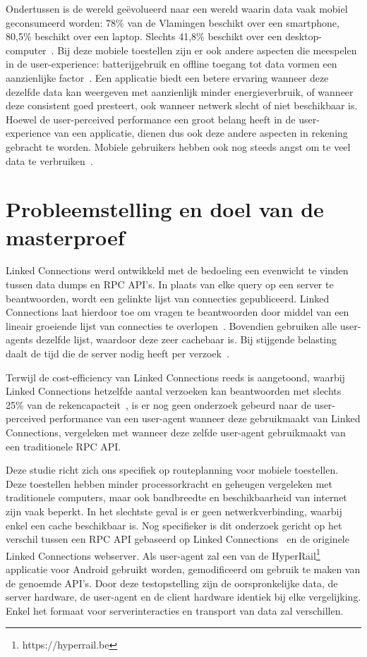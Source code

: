 Ondertussen is de wereld geëvolueerd naar een wereld waarin data vaak mobiel geconsumeerd worden: 78\% van de Vlamingen beschikt over een smartphone, 80,5\% beschikt over een laptop. Slechts 41,8\% beschikt over een desktop-computer~\citep{digimeter17}. Bij deze mobiele toestellen zijn er ook andere aspecten die meespelen in de user-experience: batterijgebruik en offline toegang tot data vormen een aanzienlijke factor~\citep{ickin12}. Een applicatie biedt een betere ervaring wanneer deze dezelfde data kan weergeven met aanzienlijk minder energieverbruik, of wanneer deze consistent goed presteert, ook wanneer netwerk slecht of niet beschikbaar is. Hoewel de user-perceived performance een groot belang heeft in de user-experience van een applicatie, dienen dus ook deze andere aspecten in rekening gebracht te worden. Mobiele gebruikers hebben ook nog steeds angst om te veel data te verbruiken~\citep{ammelrooy17}.


\section{Probleemstelling en doel van de masterproef}
\label{sec:problem}

Linked Connections werd ontwikkeld met de bedoeling een evenwicht te vinden tussen data dumps en RPC API's. In plaats van elke query op een server te beantwoorden, wordt een gelinkte lijst van connecties gepubliceerd. Linked Connections laat hierdoor toe om vragen te beantwoorden door middel van een lineair groeiende lijst van connecties te overlopen~\citep{colpaert15}. Bovendien gebruiken alle user-agents dezelfde lijst, waardoor deze zeer cachebaar is. Bij stijgende belasting daalt de tijd die de server nodig heeft per verzoek~\citep{colpaert17}.

Terwijl de cost-efficiency van Linked Connections reeds is aangetoond, waarbij Linked Connections hetzelfde aantal verzoeken kan beantwoorden met slechts 25\% van de rekencapacteit~\citep{colpaert17,Melendez17}, is er nog geen onderzoek gebeurd naar de user-perceived performance van een user-agent wanneer deze gebruikmaakt van Linked Connections, vergeleken met wanneer deze zelfde user-agent gebruikmaakt van een traditionele RPC API. 

Deze studie richt zich ons specifiek op routeplanning voor mobiele toestellen. Deze toestellen hebben minder processorkracht en geheugen vergeleken met traditionele computers, maar ook bandbreedte en beschikbaarheid van internet zijn vaak beperkt. In het slechtste geval is er geen netwerkverbinding, waarbij enkel een cache beschikbaar is. Nog specifieker is dit onderzoek gericht op het verschil tussen een RPC API gebaseerd op Linked Connections~\citep{colpaert17} en de originele Linked Connections webserver. Als user-agent zal een  van de HyperRail\footnote{https://hyperrail.be} applicatie voor Android gebruikt worden, gemodificeerd om gebruik te maken van de genoemde API's. Door deze testopstelling zijn de oorspronkelijke data, de server hardware, de user-agent en de client hardware identiek bij elke vergelijking. Enkel het formaat voor serverinteracties en transport van data zal verschillen.

